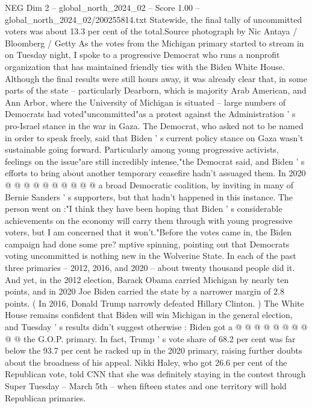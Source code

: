 \begin{textsample}{NEG Dim 2 – global\_north\_2024\_02 – Score 1.00 – global\_north\_2024\_02/200255814.txt}  \label{ex:f2_neg_183}
Statewide, the final tally of uncommitted voters was about 13.3 per cent of the total.Source photograph by Nic Antaya / Bloomberg / Getty As the votes from the Michigan primary started to stream in on Tuesday night, I spoke to a progressive Democrat who runs a nonprofit organization that has maintained friendly ties with the Biden White House.
Although the final results were still hours away, it was already clear that, in some parts of the state -- particularly Dearborn, which is majority Arab American, and Ann Arbor, where the University of Michigan is situated -- large numbers of Democrats had voted"uncommitted"as a protest against the Administration ' s pro-Israel stance in the war in Gaza.
The Democrat, who asked not to be named in order to speak freely, said that Biden ' s current policy stance on Gaza wasn't sustainable going forward.
Particularly among young progressive activists, feelings on the issue"are still incredibly intense,"the Democrat said, and Biden ' s efforts to bring about another temporary ceasefire hadn't assuaged them.
In 2020 @ @ @ @ @ @ @ @ @ @ a broad Democratic coalition, by inviting in many of Bernie Sanders ' s supporters, but that hadn't happened in this instance.
The person went on :"I think they have been hoping that Biden ' s considerable achievements on the economy will carry them through with young progressive voters, but I am concerned that it won't."Before the votes came in, the Biden campaign had done some pre? mptive spinning, pointing out that Democrats voting uncommitted is nothing new in the Wolverine State.
In each of the past three primaries -- 2012, 2016, and 2020 -- about twenty thousand people did it.
And yet, in the 2012 election, Barack Obama carried Michigan by nearly ten points, and in 2020 Joe Biden carried the state by a narrower margin of 2.8 points. ( In 2016, Donald Trump narrowly defeated Hillary Clinton. ) The White House remains confident that Biden will win Michigan in the general election, and Tuesday ' s results didn't suggest otherwise : Biden got a @ @ @ @ @ @ @ @ @ @ the G.O.P. primary.
In fact, Trump ' s vote share of 68.2 per cent was far below the 93.7 per cent he racked up in the 2020 primary, raising further doubts about the broadness of his appeal.
Nikki Haley, who got 26.6 per cent of the Republican vote, told CNN that she was definitely staying in the contest through Super Tuesday -- March 5th -- when fifteen states and one territory will hold Republican primaries.

\end{textsample}
